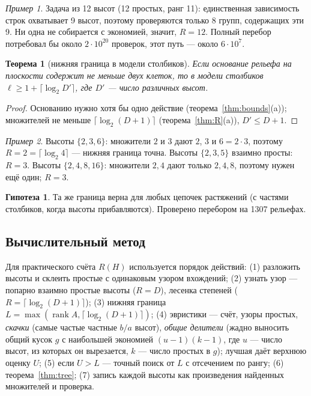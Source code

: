 \documentclass[11pt,a4paper]{article}
\theoremstyle{plain}
\newtheorem{theorem}{Теорема}[section]
\theoremstyle{definition}
\newtheorem{conjecture}{Гипотеза}
\theoremstyle{remark}
\newtheorem*{example}{Пример}
\begin{document}
\begin{example}
Задача из 12 высот (12 простых, ранг 11): единственная зависимость строк охватывает 9 высот, поэтому проверяются только 8 групп, содержащих эти 9. Ни одна не собирается с экономией, значит, $R=12$. Полный перебор потребовал бы около $2\cdot10^{20}$ проверок, этот путь — около $6\cdot10^7$.
\end{example}

\begin{theorem}[нижняя граница в модели столбиков]
Если основание рельефа на плоскости содержит не меньше двух клеток, то в модели столбиков $\ell\ge1+\lceil\log_2D'\rceil$, где $D'$ — число различных высот.
\end{theorem}
\begin{proof}
Основанию нужно хотя бы одно действие (теорема~\ref{thm:bounds}(a)); множителей не меньше $\lceil\log_2(D+1)\rceil$ (теорема~\ref{thm:R}(a)), $D'\le D+1$.
\end{proof}

\begin{example}
Высоты $\{2,3,6\}$: множители $2$ и $3$ дают $2$, $3$ и $6=2\cdot3$, поэтому $R=2=\lceil\log_2 4\rceil$ — нижняя граница точна. Высоты $\{2,3,5\}$ взаимно просты: $R=3$. Высоты $\{2,4,8,16\}$: множители $2,4$ дают только $2,4,8$, поэтому нужен ещё один; $R=3$.
\end{example}

\begin{conjecture}\label{conj:relief}
Та же граница верна для любых цепочек растяжений (с частями столбиков, когда высоты прибавляются). Проверено перебором на 1307 рельефах.
\end{conjecture}

\subsection{Вычислительный метод}\label{sec:compute}
Для практического счёта $R(H)$ используется порядок действий: (1) разложить высоты и склеить простые с одинаковым узором вхождений; (2) узнать узор — попарно взаимно простые высоты ($R=D$), лесенка степеней ($R=\lceil\log_2(D+1)\rceil$); (3) нижняя граница $L=\max(\operatorname{rank}A,\lceil\log_2(D+1)\rceil)$; (4) эвристики — счёт, узоры простых, \emph{скачки} (самые частые частные $b/a$ высот), \emph{общие делители} (жадно выносить общий кусок $g$ с наибольшей экономией $(u-1)(k-1)$, где $u$ — число высот, из которых он вырезается, $k$ — число простых в $g$); лучшая даёт верхнюю оценку $U$; (5) если $U>L$ — точный поиск от $L$ с отсечением по рангу; (6) теорема~\ref{thm:tree}; (7) запись каждой высоты как произведения найденных множителей и проверка.
\end{document}
